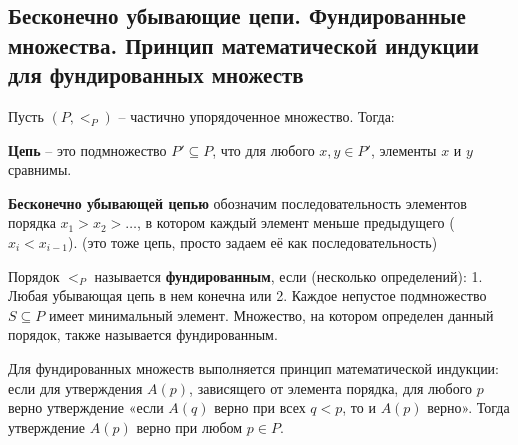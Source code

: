 \subsection{Бесконечно убывающие цепи. Фундированные множества. Принцип математической индукции для фундированных множеств}

Пусть $(P, <_P)$ -- частично упорядоченное множество. Тогда:

\textbf{Цепь} -- это подмножество $P' \subseteq P$, что для любого $x, y \in P'$, элементы $x$ и $y$ сравнимы.

\textbf{Бесконечно убывающей цепью} обозначим последовательность элементов порядка $x_1 > x_2 > \ldots$, в котором каждый элемент меньше предыдущего ($x_i < x_{i-1}$). (это тоже цепь, просто задаем её как последовательность)

Порядок $<_P$ называется \textbf{фундированным}, если (несколько определений): 1. Любая убывающая цепь в нем конечна или 2. Каждое непустое подмножество $S \subseteq P$ имеет минимальный элемент. Множество, на котором определен данный порядок, также называется фундированным.

Для фундированных множеств выполняется принцип математической индукции: если для утверждения $A(p)$, зависящего от элемента порядка, для любого $p$ верно утверждение «если $A(q)$ верно при всех $q < p$, то и $A(p)$ верно». Тогда утверждение $A(p)$ верно при любом $p \in P$.
